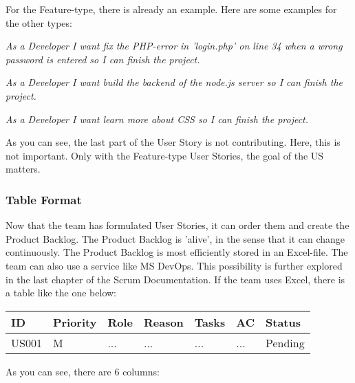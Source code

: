 \documentclass[10pt]{report}
\begin{document}
For the Feature-type, there is already an example. Here are some examples for the other types:

\emph{As a Developer I want fix the PHP-error in 'login.php' on line 34 when a wrong password is entered so I can finish the project.}

\emph{As a Developer I want build the backend of the node.js server so I can finish the project.}

\emph{As a Developer I want learn more about CSS so I can finish the project.}

As you can see, the last part of the User Story is not contributing. Here, this is not important. Only with the Feature-type User Stories, the goal of the US matters.

\subsubsection{Table Format}

Now that the team has formulated User Stories, it can order them and create the Product Backlog. The Product Backlog is 'alive', in the sense that it can change continuously. The Product Backlog is most efficiently stored in an Excel-file. The team can also use a service like MS DevOps. This possibility is further explored in the last chapter of the Scrum Documentation. If the team uses Excel, there is a table like the one below:

\medskip
\begin{tabularx}{0.8\textwidth} { 
  | >{\raggedright\arraybackslash}X 
  | >{\centering\arraybackslash}X 
  | >{\raggedright\arraybackslash}X 
  | >{\raggedright\arraybackslash}X 
  | >{\raggedright\arraybackslash}X 
  | >{\raggedright\arraybackslash}X 
  | >{\raggedleft\arraybackslash}X | }
 \hline
 ID & Priority & Role & Reason & Tasks & AC & Status \\
 \hline
 US001 & M & ... & ...  & ... & ... & Pending \\
 \hline
\end{tabularx}
\medskip

As you can see, there are 6 columns:
\end{document}
